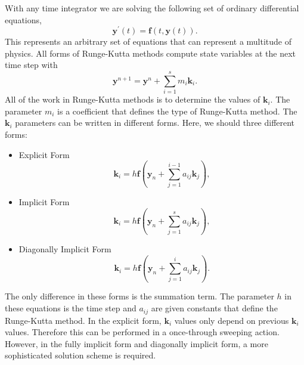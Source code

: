 \documentclass{ansconf}
\numberwithin{equation}{section}
\begin{document}
\label{sec:GRK}

With any time integrator we are solving the following set of ordinary differential equations,
\begin{equation}\label{eq:GRK_fund}
    \mathbf{y}^\prime\left(t\right) = \mathbf{f}\left(t,\mathbf{y}\left(t\right)\right).
\end{equation}
This represents an arbitrary set of equations that can represent a multitude of physics. All forms of Runge-Kutta methods compute state variables at the next time step with
\begin{equation}\label{eq:GRK_soln}
   \mathbf{y}^{n+1} = \mathbf{y}^n + \sum_{i=1}^s m_i \mathbf{k}_i.
\end{equation}
All of the work in Runge-Kutta methods is to determine the values of $\mathbf{k}_i$. The parameter $m_i$ is a coefficient that defines the type of Runge-Kutta method. The $\mathbf{k}_i$ parameters can be written in different forms. Here, we should three different forms:
\begin{itemize}
  \item Explicit Form
  \begin{equation}
   \mathbf{k}_i = h\mathbf{f}\left(\mathbf{y}_n + \sum_{j=1}^{i-1}a_{ij}\mathbf{k}_j\right),
  \end{equation}
  \item Implicit Form
  \begin{equation}
    \mathbf{k}_i = h\mathbf{f}\left(\mathbf{y}_n + \sum_{j=1}^{s}a_{ij}\mathbf{k}_j\right),
  \end{equation}
  \item Diagonally Implicit Form
  \begin{equation} \label{eq:GRK_diag}
  \mathbf{k}_i = h\mathbf{f}\left(\mathbf{y}_n + \sum_{j=1}^{i}a_{ij}\mathbf{k}_j\right).
  \end{equation}
\end{itemize}
The only difference in these forms is the summation term. The parameter $h$ in these equations is the time step and $a_{ij}$ are given constants that define the Runge-Kutta method.  In the explicit form, $\mathbf{k}_i$ values only depend on previous $\mathbf{k}_i$ values. Therefore this can be performed in a once-through sweeping action. However, in the fully implicit form and diagonally implicit form, a more sophisticated solution scheme is required.
\end{document}
